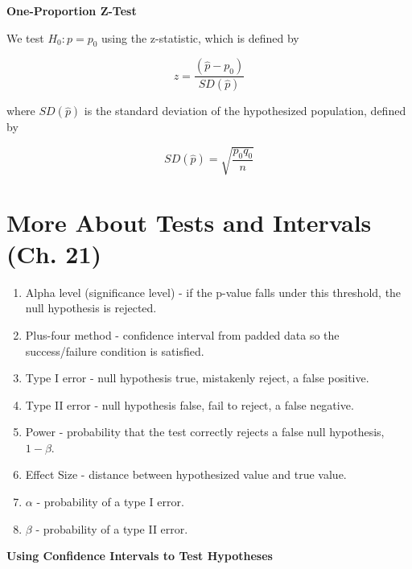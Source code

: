 \documentclass{article}
\theoremstyle{definition}
\begin{document}
\vspace{2ex}
\textbf{One-Proportion Z-Test}

We test $H_0: p = p_0$ using the z-statistic, which is defined by

\begin{equation}
    z = \frac{(\hat{p} - p_0)}{SD(\hat{p})}
\end{equation}

where $SD(\hat{p})$ is the standard deviation of the hypothesized population, defined by 

\begin{equation}
    SD(\hat{p}) = \sqrt{\frac{p_0 q_0}{n}}
\end{equation}

\pagebreak

\section{More About Tests and Intervals (Ch. 21)}

\begin{enumerate}[label=\textbf{\roman*.}]
    \item Alpha level (significance level) - if the p-value falls under this threshold, the null hypothesis is rejected.

    \item Plus-four method - confidence interval from padded data so the success/failure condition is satisfied.

    \item Type I error - null hypothesis true, mistakenly reject, a false positive.

    \item Type II error - null hypothesis false, fail to reject, a false negative.

    \item Power - probability that the test correctly rejects a false null hypothesis, $1 - \beta$.

    \item Effect Size - distance between hypothesized value and true value.

    \item $\alpha$ - probability of a type I error.

    \item $\beta$ - probability of a type II error.

\end{enumerate}

\vspace{2ex}
\textbf{Using Confidence Intervals to Test Hypotheses}
\end{document}
